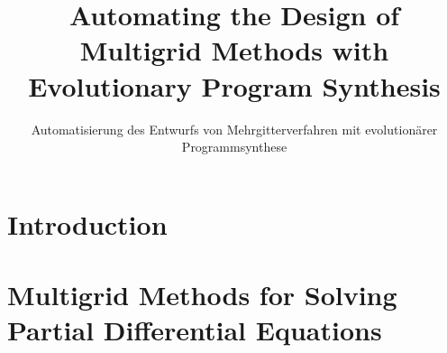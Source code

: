\documentclass[
  paper = 17x24,
  language = english,
  acronym = split,
  acronymline = novertical,
  bibliography = combined,
  bibliographypart = all,
  titlesize = Huge,
  par = halfskip,
]{faupress}
\title{Automating the Design of Multigrid Methods with Evolutionary Program Synthesis}
\subtitle{Automatisierung des Entwurfs von Mehrgitterverfahren mit evolutionärer Programmsynthese}
\institute{Lehrstuhl für Informatik 10}
\theoremstyle{definition}
\numberwithin{equation}{chapter}
\begin{document}

\frontmatter
  
  \makefacultytitle

  \begin{preface}
   
    
  \end{preface}

  \tableofcontents

  
  

\mainmatter

\chapter{Introduction}


\chapter{Multigrid Methods for Solving Partial Differential Equations}
  
  
  
\end{document}
